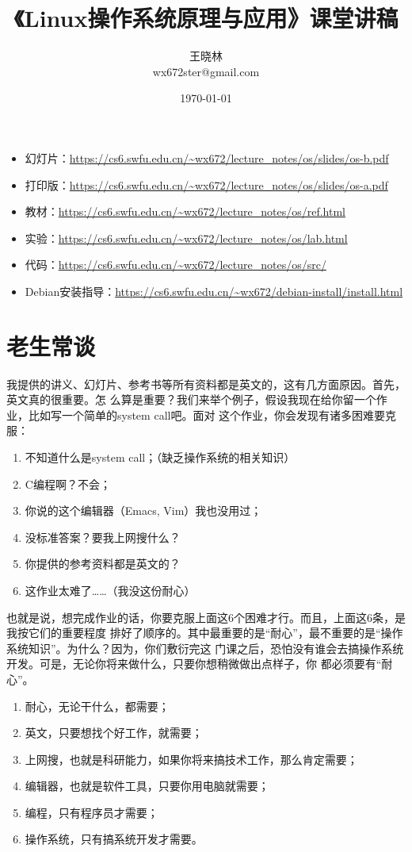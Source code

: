\documentclass{wx672ctexart}
\author{王晓林\\{\ttfamily wx672ster@gmail.com}}
\date{\today}
\title{《Linux操作系统原理与应用》课堂讲稿}
\begin{document}
\maketitle
\tableofcontents

\begin{itemize}
\item 幻灯片：\url{https://cs6.swfu.edu.cn/~wx672/lecture_notes/os/slides/os-b.pdf}
\item 打印版：\url{https://cs6.swfu.edu.cn/~wx672/lecture_notes/os/slides/os-a.pdf}
\item 教材：\url{https://cs6.swfu.edu.cn/~wx672/lecture_notes/os/ref.html}
\item 实验：\url{https://cs6.swfu.edu.cn/~wx672/lecture_notes/os/lab.html}
\item 代码：\url{https://cs6.swfu.edu.cn/~wx672/lecture_notes/os/src/}
\item Debian安装指导：\url{https://cs6.swfu.edu.cn/~wx672/debian-install/install.html}
\end{itemize}

\printbibliography[title={参考书目}]

\clearpage
\section{老生常谈}
\label{sec:orgaeba803}

我提供的讲义、幻灯片、参考书等所有资料都是英文的，这有几方面原因。首先，英文真的很重要。怎
么算是重要？我们来举个例子，假设我现在给你留一个作业，比如写一个简单的system call吧。面对
这个作业，你会发现有诸多困难要克服：
\begin{enumerate}
\item 不知道什么是system call；（缺乏操作系统的相关知识）
\item C编程啊？不会；
\item 你说的这个编辑器（Emacs, Vim）我也没用过；
\item 没标准答案？要我上网搜什么？
\item 你提供的参考资料都是英文的？
\item 这作业太难了……（我没这份耐心）
\end{enumerate}

也就是说，想完成作业的话，你要克服上面这6个困难才行。而且，上面这6条，是我按它们的重要程度
排好了顺序的。其中最重要的是“耐心”，最不重要的是“操作系统知识”。为什么？因为，你们敷衍完这
门课之后，恐怕没有谁会去搞操作系统开发。可是，无论你将来做什么，只要你想稍微做出点样子，你
都必须要有“耐心”。
\begin{enumerate}
\item 耐心，无论干什么，都需要；
\item 英文，只要想找个好工作，就需要；
\item 上网搜，也就是科研能力，如果你将来搞技术工作，那么肯定需要；
\item 编辑器，也就是软件工具，只要你用电脑就需要；
\item 编程，只有程序员才需要；
\item 操作系统，只有搞系统开发才需要。
\end{enumerate}
\end{document}
